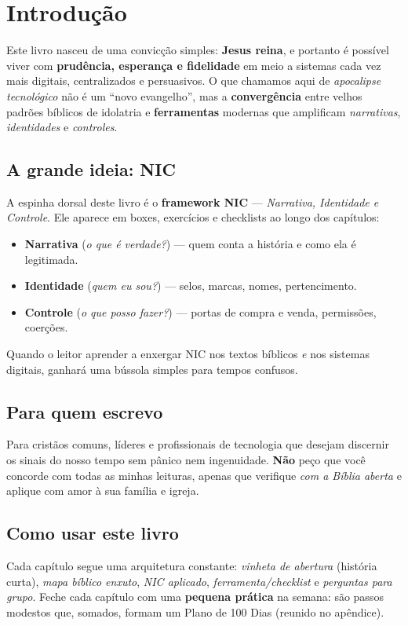 \chapter*{Introdução}

Este livro nasceu de uma convicção simples: \textbf{Jesus reina}, e portanto é possível viver com \textbf{prudência, esperança e fidelidade} em meio a sistemas cada vez mais digitais, centralizados e persuasivos. 
O que chamamos aqui de \textit{apocalipse tecnológico} não é um ``novo evangelho'', mas a \textbf{convergência} entre velhos padrões bíblicos de idolatria e \textbf{ferramentas} modernas que amplificam \emph{narrativas}, \emph{identidades} e \emph{controles}.

\section*{A grande ideia: NIC}
A espinha dorsal deste livro é o \textbf{framework NIC} --- \textit{Narrativa, Identidade e Controle}. 
Ele aparece em boxes, exercícios e checklists ao longo dos capítulos:
\begin{nicbox}
\begin{itemize}[leftmargin=*,noitemsep]
  \item \textbf{Narrativa} (\emph{o que é verdade?}) --- quem conta a história e como ela é legitimada.
  \item \textbf{Identidade} (\emph{quem eu sou?}) --- selos, marcas, nomes, pertencimento.
  \item \textbf{Controle} (\emph{o que posso fazer?}) --- portas de compra e venda, permissões, coerções.
\end{itemize}
\end{nicbox}
Quando o leitor aprender a enxergar NIC nos textos bíblicos \emph{e} nos sistemas digitais, ganhará uma bússola simples para tempos confusos.

\section*{Para quem escrevo}
Para cristãos comuns, líderes e profissionais de tecnologia que desejam discernir os sinais do nosso tempo sem pânico nem ingenuidade. \textbf{Não} peço que você concorde com todas as minhas leituras, apenas que verifique \textit{com a Bíblia aberta} e aplique com amor à sua família e igreja.

\section*{Como usar este livro}
Cada capítulo segue uma arquitetura constante: \textit{vinheta de abertura} (história curta), \textit{mapa bíblico enxuto}, \textit{NIC aplicado}, \textit{ferramenta/checklist} e \textit{perguntas para grupo}. Feche cada capítulo com uma \textbf{pequena prática} na semana: são passos modestos que, somados, formam um Plano de 100 Dias (reunido no apêndice).

